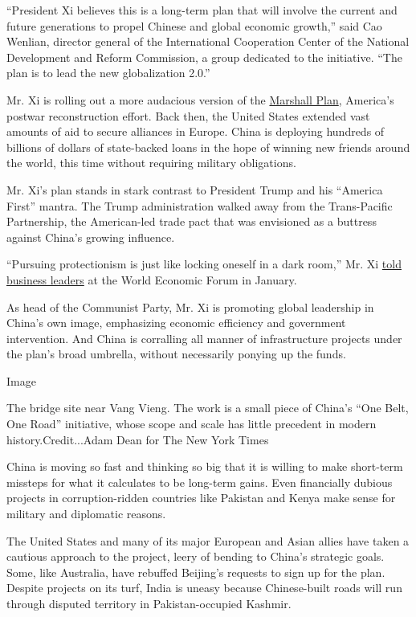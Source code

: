 ``President Xi believes this is a long-term plan that will involve the
current and future generations to propel Chinese and global economic
growth,'' said Cao Wenlian, director general of the International
Cooperation Center of the National Development and Reform Commission, a
group dedicated to the initiative. ``The plan is to lead the new
globalization 2.0.''

Mr. Xi is rolling out a more audacious version of the
\href{http://marshallfoundation.org/marshall/the-marshall-plan/history-marshall-plan/}{Marshall
Plan}, America's postwar reconstruction effort. Back then, the United
States extended vast amounts of aid to secure alliances in Europe. China
is deploying hundreds of billions of dollars of state-backed loans in
the hope of winning new friends around the world, this time without
requiring military obligations.

Mr. Xi's plan stands in stark contrast to President Trump and his
``America First'' mantra. The Trump administration walked away from the
Trans-Pacific Partnership, the American-led trade pact that was
envisioned as a buttress against China's growing influence.

``Pursuing protectionism is just like locking oneself in a dark room,''
Mr. Xi
\href{https://www.nytimes3xbfgragh.onion/2017/01/17/business/dealbook/world-economic-forum-davos-china-xi-globalization.html?_r=0}{told
business leaders} at the World Economic Forum in January.

As head of the Communist Party, Mr. Xi is promoting global leadership in
China's own image, emphasizing economic efficiency and government
intervention. And China is corralling all manner of infrastructure
projects under the plan's broad umbrella, without necessarily ponying up
the funds.

Image

The bridge site near Vang Vieng. The work is a small piece of China's
``One Belt, One Road'' initiative, whose scope and scale has little
precedent in modern history.Credit...Adam Dean for The New York Times

China is moving so fast and thinking so big that it is willing to make
short-term missteps for what it calculates to be long-term gains. Even
financially dubious projects in corruption-ridden countries like
Pakistan and Kenya make sense for military and diplomatic reasons.

The United States and many of its major European and Asian allies have
taken a cautious approach to the project, leery of bending to China's
strategic goals. Some, like Australia, have rebuffed Beijing's requests
to sign up for the plan. Despite projects on its turf, India is uneasy
because Chinese-built roads will run through disputed territory in
Pakistan-occupied Kashmir.


